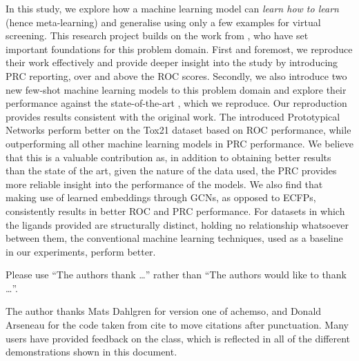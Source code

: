 \documentclass[journal=acscii,manuscript=article]{achemso}
\begin{document}
In this study, we explore how a machine learning model can \textit{learn how to learn} (hence meta-learning) and generalise using only a few examples for virtual screening. This research project builds on the work from \citet{altae2017low}, who have set important foundations for this problem domain. First and foremost, we reproduce their work effectively and provide deeper insight into the study by introducing PRC reporting, over and above the ROC scores. Secondly, we also introduce two new few-shot machine learning models to this problem domain and explore their performance against the state-of-the-art \cite{altae2017low}, which we reproduce. Our reproduction provides results consistent with the original work. The introduced Prototypical Networks perform better on the Tox21 dataset based on ROC performance, while outperforming all other machine learning models in PRC performance. We believe that this is a valuable contribution as, in addition to obtaining better results than the state of the art, given the nature of the data used, the PRC provides more reliable insight into the performance of the models. We also find that making use of learned embeddings through GCNs, as opposed to ECFPs, consistently results in better ROC and PRC performance. For datasets in which the ligands provided are structurally distinct, holding no relationship whatsoever between them, the conventional machine learning techniques, used as a baseline in our experiments, perform better.

\begin{acknowledgement}

Please use ``The authors thank \ldots'' rather than ``The
authors would like to thank \ldots''.

The author thanks Mats Dahlgren for version one of \textsf{achemso},
and Donald Arseneau for the code taken from \textsf{cite} to move
citations after punctuation. Many users have provided feedback on the
class, which is reflected in all of the different demonstrations
shown in this document.

\end{acknowledgement}




\end{document}
